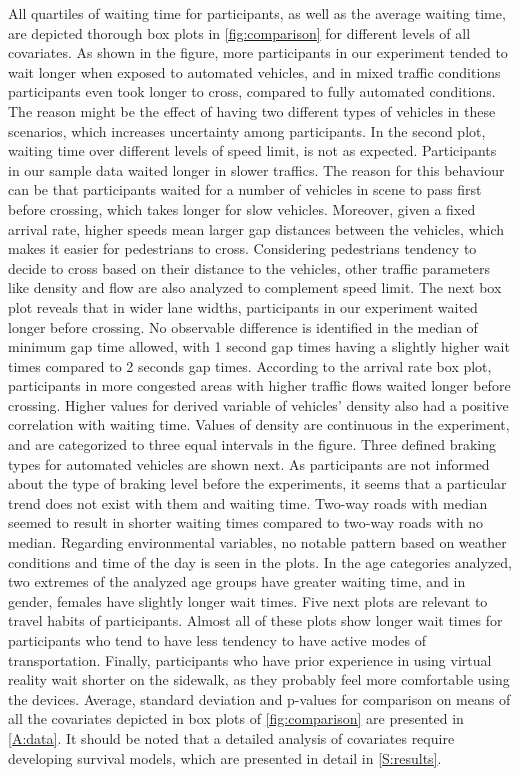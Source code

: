 All quartiles of waiting time for participants, as well as the average waiting time, are depicted thorough box plots in \cref{fig:comparison} for different levels of all covariates. As shown in the figure, more participants in our experiment tended to wait longer when exposed to automated vehicles, and in mixed traffic conditions participants even took longer to cross, compared to fully automated conditions. The reason might be the effect of having two different types of vehicles in these scenarios, which increases uncertainty among participants. In the second plot, waiting time over different levels of speed limit, is not as expected. Participants in our sample data waited longer in slower traffics. The reason for this behaviour can be that participants waited for a number of vehicles in scene to pass first before crossing, which takes longer for slow vehicles. Moreover, given a fixed arrival rate, higher speeds mean larger gap distances between the vehicles, which makes it easier for pedestrians to cross. Considering pedestrians tendency to decide to cross based on their distance to the vehicles, other traffic parameters like density and flow are also analyzed to complement speed limit. The next box plot reveals that in wider lane widths, participants in our experiment waited longer before crossing. No observable difference is identified in the median of minimum gap time allowed, with 1 second gap times having a slightly higher wait times compared to 2 seconds gap times. According to the arrival rate box plot, participants in more congested areas with higher traffic flows waited longer before crossing. Higher values for derived variable of vehicles' density also had a positive correlation with waiting time. Values of density are continuous in the experiment, and are categorized to three equal intervals in the figure. Three defined braking types for automated vehicles are shown next. As participants are not informed about the type of braking level before the experiments, it seems that a particular trend does not exist with them and waiting time. Two-way roads with median seemed to result in shorter waiting times compared to two-way roads with no median. Regarding environmental variables, no notable pattern based on weather conditions and time of the day is seen in the plots. 
In the age categories analyzed, two extremes of the analyzed age groups have greater waiting time, and in gender, females have slightly longer wait times.
Five next plots are relevant to travel habits of participants. Almost all of these plots show longer wait times for participants who tend to have less tendency to have active modes of transportation. Finally, participants who have prior experience in using virtual reality wait shorter on the sidewalk, as they probably feel more comfortable using the devices. Average, standard deviation and p-values for comparison on means of all the covariates depicted in box plots of \cref{fig:comparison} are presented in \cref{A:data}. It should be noted that a detailed analysis of covariates require developing survival models, which are presented in detail in \cref{S:results}. 

